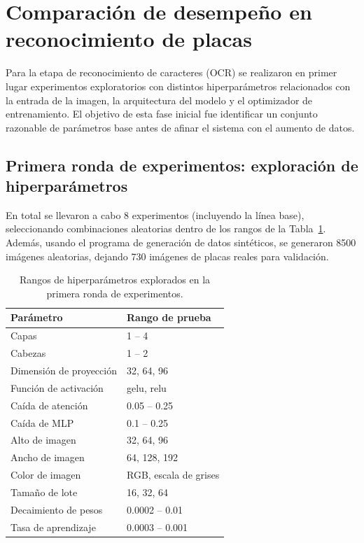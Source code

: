 \section{Comparación de desempeño en reconocimiento de placas}

Para la etapa de reconocimiento de caracteres (OCR) 
se realizaron en primer lugar experimentos exploratorios con distintos hiperparámetros
relacionados con la entrada de la imagen, la arquitectura del modelo y el optimizador de entrenamiento.
El objetivo de esta fase inicial fue identificar un conjunto razonable de parámetros base antes de afinar el sistema
con el aumento de datos.

\subsection{Primera ronda de experimentos: exploración de hiperparámetros}

En total se llevaron a cabo 8 experimentos (incluyendo la línea base), 
seleccionando combinaciones aleatorias dentro de los rangos de la Tabla~\ref{tab:hiperparam-rangos}.
Además, usando el programa de generación de datos sintéticos, se generaron 8500 imágenes aleatorias,
dejando 730 imágenes de placas reales para validación.

\begin{table}[h]
    \centering
    \begin{tabularx}{0.8\textwidth}{lX}
        \toprule
        \textbf{Parámetro} & \textbf{Rango de prueba} \\
        \midrule
        Capas & 1 -- 4 \\
        Cabezas & 1 -- 2 \\
        Dimensión de proyección & 32, 64, 96 \\
        Función de activación & gelu, relu \\
        Caída de atención & 0.05 -- 0.25 \\
        Caída de MLP & 0.1 -- 0.25 \\
        Alto de imagen & 32, 64, 96 \\
        Ancho de imagen & 64, 128, 192 \\
        Color de imagen & RGB, escala de grises \\
        Tamaño de lote & 16, 32, 64 \\
        Decaimiento de pesos & 0.0002 -- 0.01 \\
        Tasa de aprendizaje & 0.0003 -- 0.001 \\
        \bottomrule
    \end{tabularx}
    \caption{Rangos de hiperparámetros explorados en la primera ronda de experimentos.}
    \label{tab:hiperparam-rangos}
\end{table}


